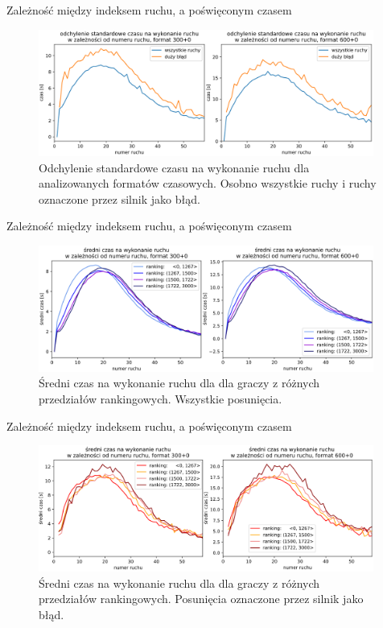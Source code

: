 \documentclass{beamer}
\begin{document}
\begin{frame}{Zależność między indeksem ruchu, a poświęconym czasem}
\begin{figure}[H]
	\centering
	\includegraphics[width=11cm]{../Formatka/std_czas_na_ruch.png}
	\caption{Odchylenie standardowe czasu na wykonanie ruchu dla analizowanych formatów czasowych. Osobno wszystkie ruchy i ruchy oznaczone przez silnik jako błąd.}
	\label{rys:std_czas_na_ruch}
\end{figure}
\end{frame}
\begin{frame}{Zależność między indeksem ruchu, a poświęconym czasem}
	\begin{figure}[H]
		\centering
		\includegraphics[width=11cm]{../Formatka/sr_czas_na_ruch_ELO_1.png}
		\caption{Średni czas na wykonanie ruchu dla dla graczy z różnych przedziałów rankingowych. Wszystkie posunięcia.}
		\label{rys:sr_czas_na_ruch_ELO_1}
	\end{figure}
\end{frame}

\begin{frame}{Zależność między indeksem ruchu, a poświęconym czasem}
	\begin{figure}[H]
		\centering
		\includegraphics[width=11cm]{../Formatka/sr_czas_na_ruch_ELO_2.png}
		\caption{Średni czas na wykonanie ruchu dla dla graczy z różnych przedziałów rankingowych. Posunięcia oznaczone przez silnik jako błąd.}
		\label{rys:sr_czas_na_ruch_ELO_2}
	\end{figure}
\end{frame}
\end{document}
